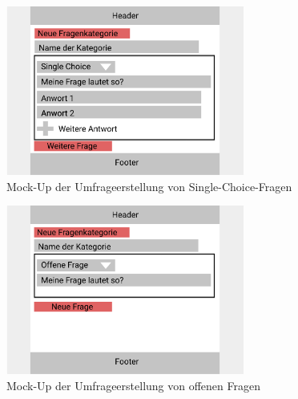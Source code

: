 \begin{figure}[h]
	\centering
	\includegraphics[width=0.7\textwidth]{img/konzeption/client/umfrage_erstellen_single_choice}
	\captionsetup{justification=centering, format=plain}
	\caption[Mock-Up der Umfrageerstellung von Single-Choice-Fragen]{Mock-Up der Umfrageerstellung von Single-Choice-Fragen\\\figma}
	\label{fig:MockUmfrageSingleChoice}
\end{figure}

\begin{figure}[h]
	\centering
	\includegraphics[width=0.7\textwidth]{img/konzeption/client/umfrage_erstellen_offene_frage}
	\captionsetup{justification=centering, format=plain}
	\caption[Mock-Up der Umfrageerstellung von offenen Fragen]{Mock-Up der Umfrageerstellung von offenen Fragen\\\figma}
	\label{fig:MockUmfrageOffeneFragen}
\end{figure}
